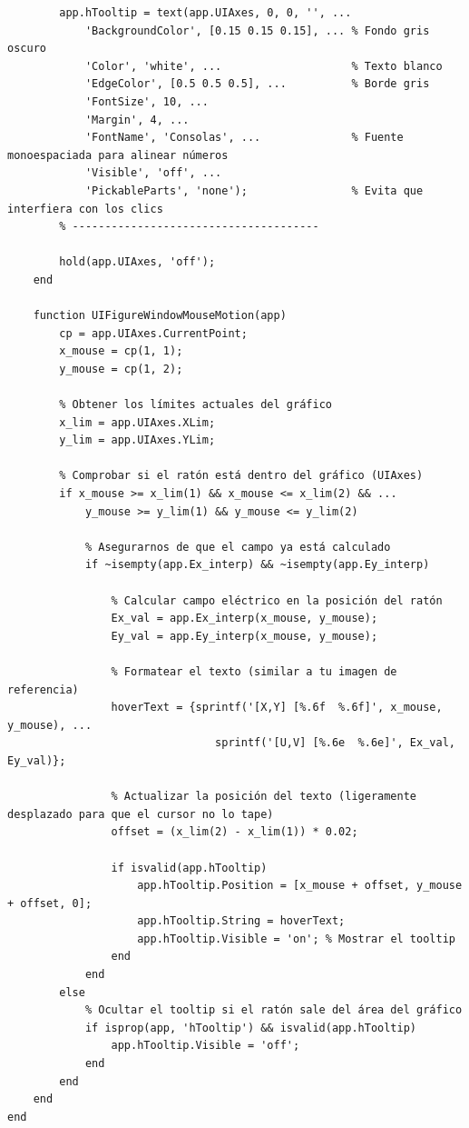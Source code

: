 \begin{lstlisting}[style=Matlab-editor]
        % Crear un objeto de texto flotante oculto por defecto
        app.hTooltip = text(app.UIAxes, 0, 0, '', ...
            'BackgroundColor', [0.15 0.15 0.15], ... % Fondo gris oscuro
            'Color', 'white', ...                    % Texto blanco
            'EdgeColor', [0.5 0.5 0.5], ...          % Borde gris
            'FontSize', 10, ...
            'Margin', 4, ...
            'FontName', 'Consolas', ...              % Fuente monoespaciada para alinear números
            'Visible', 'off', ...
            'PickableParts', 'none');                % Evita que interfiera con los clics
        % --------------------------------------

        hold(app.UIAxes, 'off');
    end
    
    function UIFigureWindowMouseMotion(app)
        cp = app.UIAxes.CurrentPoint;
        x_mouse = cp(1, 1);
        y_mouse = cp(1, 2);
        
        % Obtener los límites actuales del gráfico
        x_lim = app.UIAxes.XLim;
        y_lim = app.UIAxes.YLim;
        
        % Comprobar si el ratón está dentro del gráfico (UIAxes)
        if x_mouse >= x_lim(1) && x_mouse <= x_lim(2) && ...
            y_mouse >= y_lim(1) && y_mouse <= y_lim(2)
            
            % Asegurarnos de que el campo ya está calculado
            if ~isempty(app.Ex_interp) && ~isempty(app.Ey_interp)
                
                % Calcular campo eléctrico en la posición del ratón
                Ex_val = app.Ex_interp(x_mouse, y_mouse);
                Ey_val = app.Ey_interp(x_mouse, y_mouse);
                
                % Formatear el texto (similar a tu imagen de referencia)
                hoverText = {sprintf('[X,Y] [%.6f  %.6f]', x_mouse, y_mouse), ...
                                sprintf('[U,V] [%.6e  %.6e]', Ex_val, Ey_val)};
                            
                % Actualizar la posición del texto (ligeramente desplazado para que el cursor no lo tape)
                offset = (x_lim(2) - x_lim(1)) * 0.02;
                
                if isvalid(app.hTooltip)
                    app.hTooltip.Position = [x_mouse + offset, y_mouse + offset, 0];
                    app.hTooltip.String = hoverText;
                    app.hTooltip.Visible = 'on'; % Mostrar el tooltip
                end
            end
        else
            % Ocultar el tooltip si el ratón sale del área del gráfico
            if isprop(app, 'hTooltip') && isvalid(app.hTooltip)
                app.hTooltip.Visible = 'off';
            end
        end
    end
end

\end{lstlisting}

